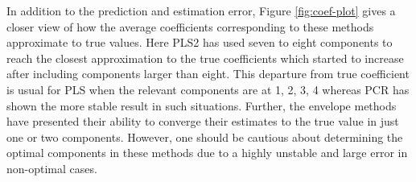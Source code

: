 \documentclass[12pt,3p,authoryear]{elsarticle}
\begin{document}
In addition to the prediction and estimation error, Figure \ref{fig:coef-plot} gives a closer view of how the average coefficients corresponding to these methods approximate to true values. Here PLS2 has used seven to eight components to reach the closest approximation to the true coefficients which started to increase after including components larger than eight. This departure from true coefficient is usual for PLS when the relevant components are at 1, 2, 3, 4 whereas PCR has shown the more stable result in such situations. Further, the envelope methods have presented their ability to converge their estimates to the true value in just one or two components. However, one should be cautious about determining the optimal components in these methods due to a highly unstable and large error in non-optimal cases.

\begin{table}[t]


\end{table}
\end{document}
